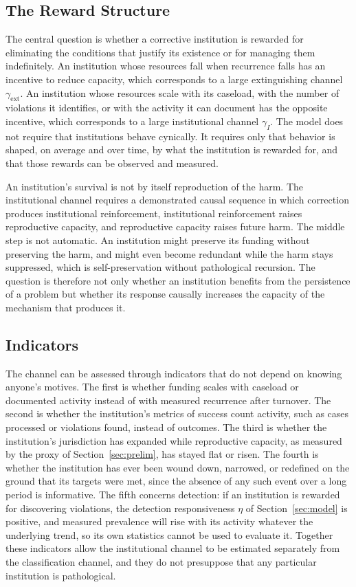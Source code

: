 \documentclass[12pt]{article}
\theoremstyle{remark}
\begin{document}
\subsection{The Reward Structure}

The central question is whether a corrective institution is rewarded for eliminating the conditions that justify its existence or for managing them indefinitely. An institution whose resources fall when recurrence falls has an incentive to reduce capacity, which corresponds to a large extinguishing channel $\gamma_{\mathrm{ext}}$. An institution whose resources scale with its caseload, with the number of violations it identifies, or with the activity it can document has the opposite incentive, which corresponds to a large institutional channel $\gamma_I$. The model does not require that institutions behave cynically. It requires only that behavior is shaped, on average and over time, by what the institution is rewarded for, and that those rewards can be observed and measured.

An institution's survival is not by itself reproduction of the harm. The institutional channel requires a demonstrated causal sequence in which correction produces institutional reinforcement, institutional reinforcement raises reproductive capacity, and reproductive capacity raises future harm. The middle step is not automatic. An institution might preserve its funding without preserving the harm, and might even become redundant while the harm stays suppressed, which is self-preservation without pathological recursion. The question is therefore not only whether an institution benefits from the persistence of a problem but whether its response causally increases the capacity of the mechanism that produces it.

\subsection{Indicators}

The channel can be assessed through indicators that do not depend on knowing anyone's motives. The first is whether funding scales with caseload or documented activity instead of with measured recurrence after turnover. The second is whether the institution's metrics of success count activity, such as cases processed or violations found, instead of outcomes. The third is whether the institution's jurisdiction has expanded while reproductive capacity, as measured by the proxy of Section~\ref{sec:prelim}, has stayed flat or risen. The fourth is whether the institution has ever been wound down, narrowed, or redefined on the ground that its targets were met, since the absence of any such event over a long period is informative. The fifth concerns detection: if an institution is rewarded for discovering violations, the detection responsiveness $\eta$ of Section~\ref{sec:model} is positive, and measured prevalence will rise with its activity whatever the underlying trend, so its own statistics cannot be used to evaluate it. Together these indicators allow the institutional channel to be estimated separately from the classification channel, and they do not presuppose that any particular institution is pathological.
\end{document}
